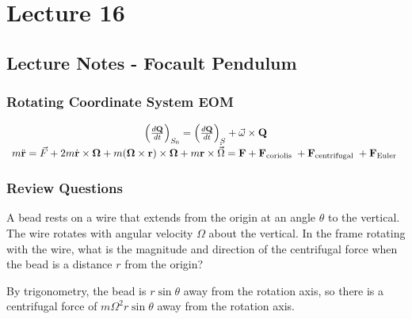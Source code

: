 \section{Lecture 16}
\subsection{Lecture Notes - Focault Pendulum}
\subsubsection{Rotating Coordinate System EOM}
\[
\begin{array}{c}
\left(\frac{d \mathbf{Q}}{d t}\right)_{S_{0}}=\left(\frac{d \mathbf{Q}}{d t}\right)_{S}+\vec{\omega} \times \mathbf{Q} \\
m \ddot{\mathbf{r}}=\vec{F}+2 m \dot{\mathbf{r}} \times \mathbf{\Omega}+m(\mathbf{\Omega} \times \mathbf{r}) \times \mathbf{\Omega}+m \mathbf{r} \times \dot{\vec{\Omega}}=\mathbf{F}+\mathbf{F}_{\text {coriolis }}+\mathbf{F}_{\text {centrifugal }}+\mathbf{F}_{\text {Euler }}
\end{array}
\]

\subsubsection{Review Questions}
A bead rests on a wire that extends from the origin at an angle $\theta$ to the vertical. The wire rotates with angular velocity $\Omega$ about the vertical. In the frame rotating with the wire, what is the magnitude and direction of the centrifugal force when the bead is a distance $r$ from the origin?
\begin{s}
By trigonometry, the bead is $r\sin\theta$ away from the rotation axis, so there is a centrifugal force of $m\Omega^2r\sin\theta$ away from the rotation axis.
\end{s}


